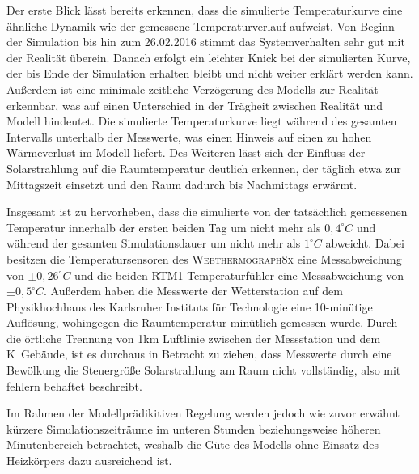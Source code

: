 Der erste Blick lässt bereits erkennen, dass die simulierte Temperaturkurve eine ähnliche Dynamik wie der gemessene Temperaturverlauf aufweist. Von Beginn der Simulation bis hin zum 26.02.2016 stimmt das Systemverhalten sehr gut mit der Realität überein. Danach erfolgt ein leichter Knick bei der simulierten Kurve, der bis Ende der Simulation erhalten bleibt und nicht weiter erklärt werden kann. 
Außerdem ist eine minimale zeitliche Verzögerung des Modells zur Realität erkennbar, was auf einen Unterschied in der Trägheit zwischen Realität und Modell hindeutet.
Die simulierte Temperaturkurve liegt während des gesamten Intervalls unterhalb der Messwerte, was einen Hinweis auf einen zu hohen Wärmeverlust im Modell liefert.  
Des Weiteren lässt sich der Einfluss der Solarstrahlung auf die Raumtemperatur deutlich erkennen, der täglich etwa zur Mittagszeit einsetzt und den Raum dadurch bis Nachmittags erwärmt.

Insgesamt ist zu hervorheben, dass die simulierte von der tatsächlich gemessenen Temperatur innerhalb der ersten beiden Tag um nicht mehr als $0,4^{\circ}C$ und während der gesamten Simulationsdauer um nicht mehr als $1^{\circ}C$ abweicht.
Dabei besitzen die Temperatursensoren des \textsc{Webthermograph8x} eine Messabweichung von $\pm 0,26^{\circ}C$ und die beiden RTM1 Temperaturfühler eine Messabweichung von $\pm 0,5^{\circ}C$.
Außerdem haben die Messwerte der Wetterstation auf dem Physikhochhaus des Karlsruher Instituts für Technologie eine 10-minütige Auflösung, wohingegen die Raumtemperatur minütlich gemessen wurde.
Durch die örtliche Trennung von 1km Luftlinie zwischen der Messstation und dem K~Gebäude, ist es durchaus in Betracht zu ziehen, dass Messwerte durch eine Bewölkung die Steuergröße Solarstrahlung am Raum nicht vollständig, also mit fehlern behaftet beschreibt.

Im Rahmen der Modellprädikitiven Regelung werden jedoch wie zuvor erwähnt kürzere Simulationszeiträume im unteren Stunden beziehungsweise höheren Minutenbereich betrachtet, weshalb die Güte des Modells ohne Einsatz des Heizkörpers dazu ausreichend ist.

